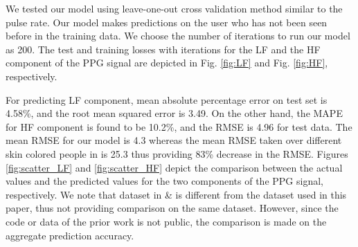  We  tested our model using leave-one-out cross validation method similar to the pulse rate. Our model makes predictions on the user who has not been seen before in the training data. We choose the  number of iterations to run our model as 200. The test and training losses with iterations for the LF and the HF component of the PPG signal are depicted in  Fig. \ref{fig:LF} and Fig. \ref{fig:HF}, respectively.  

For predicting LF component, mean absolute percentage error on test set is 4.58\%, and  the root mean squared error is 3.49. On the other hand, the MAPE for  HF component is found to be 10.2\%,  and the RMSE is 4.96 for test data.  The mean RMSE for our model is 4.3 whereas the mean RMSE taken over different skin colored people in \cite{kumar2015distanceppg} is 25.3 thus providing 83\% decrease in the RMSE. Figures \ref{fig:scatter_LF} and \ref{fig:scatter_HF} depict the comparison between the actual values and the predicted values for the two components of the PPG signal, respectively. We note that dataset in \cite{kumar2015distanceppg} \& \cite{osman2015supervised} is different from the dataset used in this paper, thus not providing comparison on the same dataset. However, since the code or data of the prior work is not public, the comparison is made on the aggregate prediction accuracy.  





%



